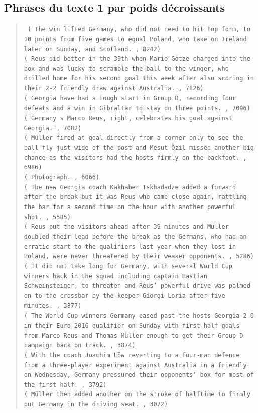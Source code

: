 \documentclass[a4paper, 12pt]{article}
\begin{document}
\subsection{Phrases du texte 1 par poids décroissants}

\begin{quotation}
\texttt{
 ( The win lifted Germany,  who did not need to hit top form,  to 10 points from five games to equal Poland,  who take on Ireland later on Sunday,  and Scotland. , 8242)\\
( Reus did better in the 39th when Mario Götze charged into the box and was lucky to scramble the ball to the winger,  who drilled home for his second goal this week after also scoring in their 2-2 friendly draw against Australia. , 7826)\\
( Georgia have had a tough start in Group D,  recording four defeats and a win in Gibraltar to stay on three points. , 7096)\\
("Germany s Marco Reus,  right,  celebrates his goal against Georgia.", 7082)\\
( Müller fired at goal directly from a corner only to see the ball fly just wide of the post and Mesut Özil missed another big chance as the visitors had the hosts firmly on the backfoot. , 6986)\\
( Photograph. , 6066)\\
( The new Georgia coach Kakhaber Tskhadadze added a forward after the break but it was Reus who came close again,  rattling the bar for a second time on the hour with another powerful shot. , 5585)\\
( Reus put the visitors ahead after 39 minutes and Müller doubled their lead before the break as the Germans,  who had an erratic start to the qualifiers last year when they lost in Poland,  were never threatened by their weaker opponents. , 5286)\\
( It did not take long for Germany,  with several World Cup winners back in the squad including captain Bastian Schweinsteiger,  to threaten and Reus’ powerful drive was palmed on to the crossbar by the keeper Giorgi Loria after five minutes. , 3877)\\
( The World Cup winners Germany eased past the hosts Georgia 2-0 in their Euro 2016 qualifier on Sunday with first-half goals from Marco Reus and Thomas Müller enough to get their Group D campaign back on track. , 3874)\\
( With the coach Joachim Löw reverting to a four-man defence from a three-player experiment against Australia in a friendly on Wednesday,  Germany pressured their opponents’ box for most of the first half. , 3792)\\
( Müller then added another on the stroke of halftime to firmly put Germany in the driving seat. , 3072)
}
\end{quotation}
\end{document}
